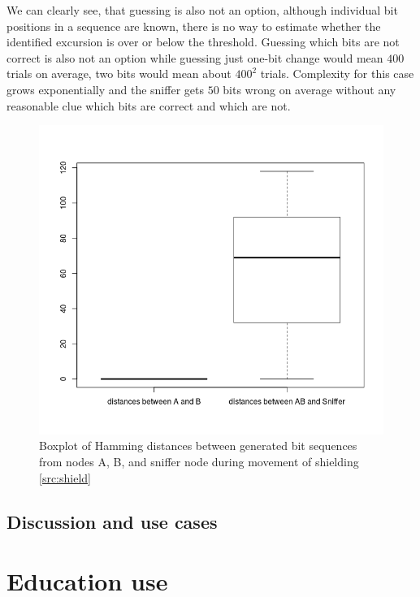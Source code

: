 \documentclass[
  print, %
  Table,   %
  nolof,     %
  nolot,     %
           oneside
]{fithesis3}
\begin{document}
We can clearly see, that guessing is also not an option, although individual bit positions in a sequence are known, there is no way to estimate whether the identified excursion is over or below the threshold. Guessing which bits are not correct is also not an option while guessing just one-bit change would mean $400$ trials on average, two bits would mean about $400^2$ trials. Complexity for this case grows exponentially and the sniffer gets $50$ bits wrong on average without any reasonable clue which bits are correct and which are not.

  \begin{figure}
    \includegraphics[width=\textwidth]{../images/boxplotDistancesRottation.png}
  \caption{Boxplot of Hamming distances between generated bit sequences from nodes A, B, and sniffer node during movement of shielding \ref{src:shield}}
  \label{fig:errorsS}
  \end{figure}

  \section{Discussion and use cases}\label{sec:use}


\chapter{Education use}\label{ch:edu}
\end{document}
